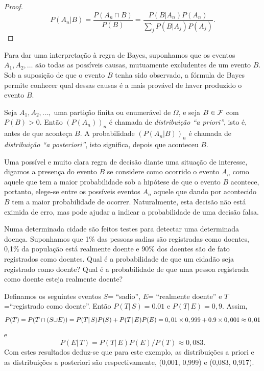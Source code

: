 \begin{frame}
 \begin{proof}
$$P(A_{n}|B)=\frac{P(A_{n}\cap B)}{P(B)}=
\frac{P(B|A_{n})P(A_{n})}{\sum_{j}P(B|A_{j})P(A_{j})}.$$
\end{proof}
Para dar uma interpretação à regra de Bayes, suponhamos que os eventos $A_1, A_2, \ldots $ são todas as possíveis causas, mutuamente excludentes de um evento $B.$ Sob a suposição de que o evento $B$ tenha sido observado, a fórmula de Bayes permite conhecer qual dessas causas é a mais provável de haver produzido o evento $B.$

\begin{defi}
Seja $A_{1},A_{2},\ldots ,$ uma partição finita ou enumerável de $\Omega $, e seja $B \in {\cal F}$ com $P(B)>0$. Então 
$(P(A_{n}))_{n}$ é chamada  de \textit{distribuição ``a priori''}, isto é, antes de que aconteça $B.$ A probabilidade $(P(A_{n}|B))_{n}$ é chamada de 
\textit{distribuição ``a posteriori''}, isto significa, depois que aconteceu $B.$
\end{defi}

Uma possível e muito clara regra de decisão diante uma situação de interesse, digamos a presença do evento $B$ se considere como ocorrido o evento $A_n$ como aquele que tem a maior probabilidade sob a hipótese de que o evento $B$ acontece, portanto, elege-se entre os possíveis eventos $A_n$ aquele que dando por acontecido $B$ tem a maior probabilidade de ocorrer. Naturalmente, esta decisão não está eximida de erro, mas pode ajudar a indicar a probabilidade de uma decisão falsa.
\end{frame}

\begin{frame}
\begin{exem}
Numa determinada cidade são feitos testes para detectar uma determinada doença. Suponhamos que  1\% das pessoas sadias são registradas como doentes,  0,1\% da população está realmente doente e  90\% dos doentes são de fato registrados como doentes. Qual é a probabilidade de que um cidadão seja registrado como doente? Qual é a probabilidade de que uma pessoa registrada como doente esteja  realmente doente?  
 \end{exem}
 
 Definamos os seguintes eventos $S$= ``sadio'', $E$= ``realmente doente'' e $T$=``registrado como doente''.  Então $P(T|\,S)=0.01$ e $P(T|\,E)=0,9$. Assim,  $$P(T)=P(T\cap (S{\huge \cup} E))=P(T|\,S)P(S)+P(T|\,E)P(E)=0,01\times 0,999+0.9\times 0,001\approx 0,01$$ e $$P(E|\,T)=P(T|\,E)P(E)/P(T)\approx 0,083.$$ Com estes resultados deduz-se que para este exemplo,  as distribuições a priori  e as distribuições a posteriori são respectivamente, (0,001, 0,999) e  (0,083, 0,917). 
\end{frame}

